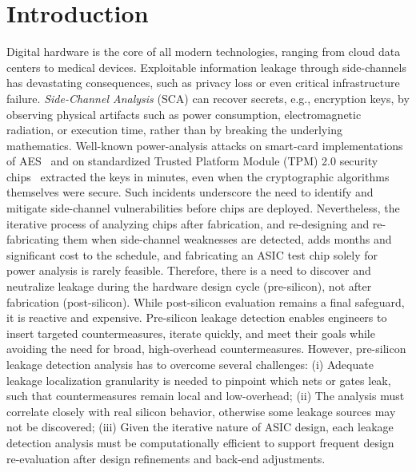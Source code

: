 \documentclass[sigconf]{acmart}
\begin{document}
\maketitle
\section{Introduction}
{
Digital hardware is the core of all modern technologies, ranging from cloud data centers to medical devices. Exploitable information leakage through side-channels has devastating consequences, such as privacy loss or even critical infrastructure failure. \emph{Side-Channel Analysis} (SCA) can recover secrets, e.g., encryption keys, by observing physical artifacts such as power consumption, electromagnetic radiation, or execution time, rather than by breaking the underlying mathematics. Well-known power-analysis attacks on smart-card implementations of AES~\cite{cardpo,10752477,kocher} and on standardized Trusted Platform Module (TPM) 2.0 security chips~\cite{tpm} extracted the keys in minutes, even when the cryptographic algorithms themselves were secure. Such incidents underscore the need to identify and mitigate side-channel vulnerabilities before chips are deployed. Nevertheless, the iterative process of analyzing chips after fabrication, and re-designing and re-fabricating them when side-channel weaknesses are detected, adds months and significant cost to the schedule, and fabricating an ASIC test chip solely for power analysis is rarely feasible. Therefore, there is a need to discover and neutralize leakage during the hardware design cycle (pre-silicon), not after fabrication (post-silicon).
While post-silicon evaluation remains a final safeguard, it is reactive and expensive.
Pre-silicon leakage detection enables engineers to insert targeted countermeasures, iterate quickly, and meet their goals while avoiding the need for broad, high-overhead countermeasures.
However, pre-silicon leakage detection analysis has to overcome several challenges: (i) Adequate leakage localization granularity is needed to pinpoint which nets or gates leak, such that countermeasures remain local and low-overhead;  
(ii) The analysis must correlate closely with real silicon behavior, otherwise some leakage sources may not be discovered; (iii) Given the iterative nature of ASIC design, each leakage detection analysis must be computationally efficient to support frequent design re-evaluation after design refinements and back-end adjustments.


}
\end{document}
